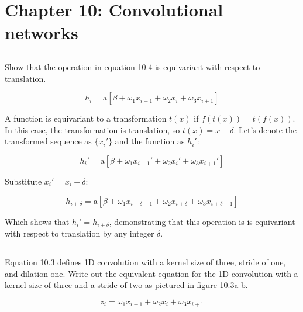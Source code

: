 \documentclass[12pt]{report}
\begin{document}
\section*{Chapter 10: Convolutional networks}

\subsection{}
\begin{mdframed}
    Show that the operation in equation 10.4 is equivariant with respect to translation.
\end{mdframed}

\begin{equation}
    h_{i} = \text{a}[\beta + \omega_{1}x_{i-1} + \omega_{2}x_{i} + \omega_{3}x_{i+1}]
    \tag{10.4}
\end{equation}

A function is equivariant to a transformation $t(x)$ if $f(t(x)) = t(f(x))$. In this case, the transformation is translation, so $t(x) = x + \delta$. Let's denote the transformed sequence as $\{x_{i}'\}$ and the function as $h_{i}'$:

\begin{equation*}
    h_{i}' = \text{a}[\beta + \omega_{1}x_{i-1}' + \omega_{2}x_{i}' + \omega_{3}x_{i+1}']
\end{equation*}

Substitute $x_{i}' = x_{i} + \delta$:

\begin{equation*}
    h_{i+\delta} = \text{a}[\beta + \omega_{1}x_{i+ \delta-1} + \omega_{2}x_{i+ \delta} + \omega_{3}x_{i+ \delta+1}]
\end{equation*}

Which shows that $h_{i}' = h_{i+\delta}$, demonstrating that this operation is is equivariant with respect to translation by any integer $\delta$.


\subsection{}
\begin{mdframed}
    Equation 10.3 defines 1D convolution with a kernel size of three, stride of one, and dilation one. Write out the equivalent equation for the 1D convolution with a kernel size of three and a stride of two as pictured in figure 10.3a-b.
\end{mdframed}

\begin{equation}
    z_{i} = \omega_{1}x_{i-1} + \omega_{2}x_{i} + \omega_{3}x_{i+1}
    \tag{10.3}
\end{equation}
\end{document}
